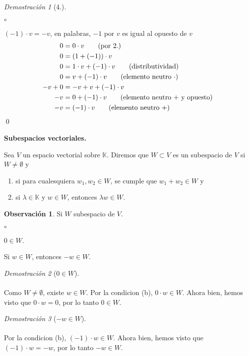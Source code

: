 \documentclass{article}
\theoremstyle{definition}
\theoremstyle{definition}
\newtheorem*{obs}{Observación}
\theoremstyle{remark}
\newtheorem*{demo}{Demostración}
\begin{document}
\begin{demo}[4.] \;
\begin{list}{$\circ$}{}  
\item $(-1)\cdot v=-v$, en palabras, $-1$ por $v$ es igual al opuesto de $v$ 
\begin{align}
  0&=0\cdot v \tag{por 2.} \\
  0&=(1+(-1))\cdot v \notag \\
  0&=1 \cdot v + (-1) \cdot v \tag{distributividad} \\
  0&=v+(-1)\cdot v \tag{elemento neutro $\cdot$} \\
  -v+0 &= -v+v+(-1)\cdot v \notag \\
  -v &= 0 +(-1)\cdot v \tag{elemento neutro $+$ y opuesto} \\
  -v&=(-1)\cdot v \tag{elemento neutro $+$} 
 \notag
 \end{align}
 \qed
\end{list}
\end{demo}
\begin{center}
\textbf{Subespacios vectoriales.}
\end{center}
\begin{defi}
  Sea $V$ un espacio vectorial sobre $\mathbb{K}$. Diremos que $W \subset V$ es un subespacio de $V$ si $W \neq \emptyset$ y \begin{enumerate}[label=(\alph*)]
    \item si para cualesquiera $w_1, w_2 \in W$, se cumple que $w_1+w_2 \in W$ y 
    \item si $\lambda \in \mathbb{K}$ y $w \in W$, entonces $\lambda w \in W$.

  \end{enumerate}
\end{defi}
\begin{obs}\;
  Si $W$ subespacio de $V$. 
\begin{list}{$\circ$}{}  
\item $0 \in W$. 
\item Si $w \in W$, entonces $-w \in W$.
\end{list}
\end{obs}
\begin{demo}[$0 \in W$] \;\\\\
  Como $W\neq \emptyset$, existe $w \in W$. Por la condicion (b), $0 \cdot w \in W$. Ahora bien, hemos visto que $0 \cdot w = 0$, por lo tanto $0 \in W$.\\
\end{demo}
\begin{demo}[$-w \in W$]\;\\\\
Por la condicion (b), $(-1)\cdot w \in W$. Ahora bien, hemos visto que $(-1) \cdot w = -w$, por lo tanto $-w \in W$.
\end{demo}\;
\end{document}
